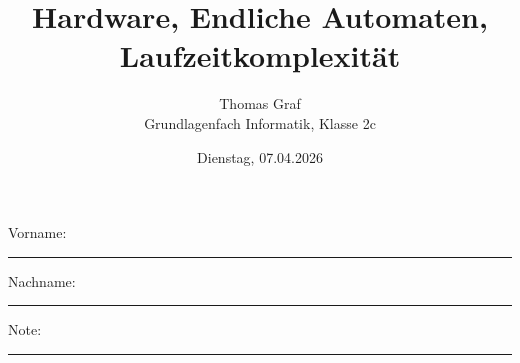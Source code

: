 \newtoggle{withbonus} \toggletrue{withbonus} %

\newcommand{\mycourse}{Grundlagenfach Informatik}
\newcommand{\myclass}{Klasse 2c}
\newcommand{\mydate}{Dienstag, 07.04.2026}

\title{\textbf{Hardware, Endliche Automaten, Laufzeitkomplexität}}
\author{Thomas Graf\\
	\mycourse, \myclass}
\date{\mydate}
\maketitle
\thispagestyle{headandfoot}

\begin{center}
\end{center}
\vspace{10mm}

\begin{center}
	Vorname: \rule{45mm}{0.8pt}\qquad Nachname: \rule{45mm}{0.8pt}
\end{center}
\vspace{20mm}

\begin{center}
	\iftoggle{withbonus} {
		\combinedgradetable[h][questions]
	} {
		\gradetable[h][questions]
	}
\end{center}
\vspace{15mm}
\begin{center}
	Note:
	\vspace{10mm}

	\rule{8mm}{1.2pt}
\end{center}
\clearpage

